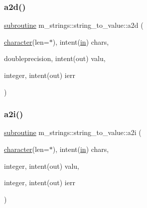 \subsubsection{\texorpdfstring{a2d()}{a2d()}}
{\footnotesize\ttfamily \hyperlink{M__stopwatch_83_8txt_acfbcff50169d691ff02d4a123ed70482}{subroutine} m\+\_\+strings\+::string\+\_\+to\+\_\+value\+::a2d (\begin{DoxyParamCaption}\item[{\hyperlink{option__stopwatch_83_8txt_abd4b21fbbd175834027b5224bfe97e66}{character}(len=$\ast$), intent(\hyperlink{M__journal_83_8txt_afce72651d1eed785a2132bee863b2f38}{in})}]{chars,  }\item[{doubleprecision, intent(out)}]{valu,  }\item[{integer, intent(out)}]{ierr }\end{DoxyParamCaption})\hspace{0.3cm}{\ttfamily [private]}}

\mbox{\label{interfacem__strings_1_1string__to__value_a2089572a0b06d524be83d9089589c959}} 
\subsubsection{\texorpdfstring{a2i()}{a2i()}}
{\footnotesize\ttfamily \hyperlink{M__stopwatch_83_8txt_acfbcff50169d691ff02d4a123ed70482}{subroutine} m\+\_\+strings\+::string\+\_\+to\+\_\+value\+::a2i (\begin{DoxyParamCaption}\item[{\hyperlink{option__stopwatch_83_8txt_abd4b21fbbd175834027b5224bfe97e66}{character}(len=$\ast$), intent(\hyperlink{M__journal_83_8txt_afce72651d1eed785a2132bee863b2f38}{in})}]{chars,  }\item[{integer, intent(out)}]{valu,  }\item[{integer, intent(out)}]{ierr }\end{DoxyParamCaption})\hspace{0.3cm}{\ttfamily [private]}}

\mbox{\label{interfacem__strings_1_1string__to__value_aec779c978fa7bcc812c6cb029321b5f0}} 
